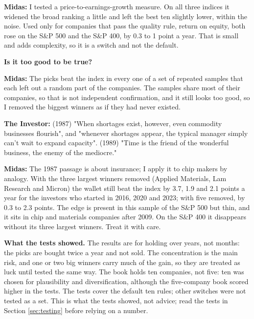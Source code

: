 \documentclass[11pt,a4paper]{article}
\begin{document}
\textbf{Midas:} I tested a price-to-earnings-growth measure. On all three indices it widened the broad ranking a little and left the best ten slightly lower, within the noise. Used only for companies that pass the quality rule, return on equity, both rose on the S\&P 500 and the S\&P 400, by 0.3 to 1 point a year. That is small and adds complexity, so it is a switch and not the default.

\textbf{Is it too good to be true?}

\textbf{Midas:} The picks beat the index in every one of a set of repeated samples that each left out a random part of the companies. The samples share most of their companies, so that is not independent confirmation, and it still looks too good, so I removed the biggest winners as if they had never existed.

\textbf{The Investor:} (1987) "When shortages exist, however, even commodity businesses flourish", and "whenever shortages appear, the typical manager simply can't wait to expand capacity". (1989) "Time is the friend of the wonderful business, the enemy of the mediocre."

\textbf{Midas:} The 1987 passage is about insurance; I apply it to chip makers by analogy. With the three largest winners removed (Applied Materials, Lam Research and Micron) the wallet still beat the index by 3.7, 1.9 and 2.1 points a year for the investors who started in 2016, 2020 and 2023; with five removed, by 0.3 to 2.3 points. The edge is present in this sample of the S\&P 500 but thin, and it sits in chip and materials companies after 2009. On the S\&P 400 it disappears without its three largest winners. Treat it with care.

\textbf{What the tests showed.} The results are for holding over years, not months: the picks are bought twice a year and not sold. The concentration is the main risk, and one or two big winners carry much of the gain, so they are treated as luck until tested the same way. The book holds ten companies, not five: ten was chosen for plausibility and diversification, although the five-company book scored higher in the tests. The tests cover the default ten rules; other switches were not tested as a set. This is what the tests showed, not advice; read the tests in Section \ref{sec:testing} before relying on a number.
\end{document}
